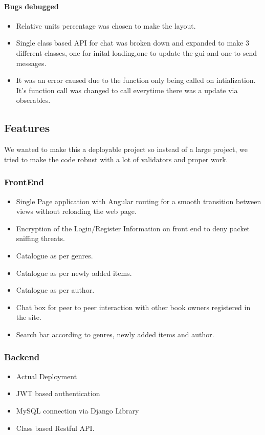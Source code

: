 \documentclass[12pt]{article}
\begin{document}
\paragraph{Bugs debugged}
\begin{itemize}
    \item Relative units percentage was chosen to make the layout.
    \item Single class based API for chat was broken down and expanded to make 3 different classes, one for inital loading,one to update the gui and one to send messages.
    \item It was an error caused due to the function only being called on intialization. It's function call was changed to call everytime there was a update via obserables.
\end{itemize}
\clearpage
\subsection{Features}
We wanted to make this a deployable project so instead of a large project, we tried to make the code robust with a lot of validators and proper work.

\subsubsection{FrontEnd}
\begin{itemize}
    \item Single Page application with Angular routing for a smooth transition between views without reloading the web page.
    \item Encryption of the Login/Register Information on front end to deny packet sniffing threats.
    \item Catalogue as per genres.
    \item Catalogue as per newly added items.
    \item Catalogue as per author.
    \item Chat box for peer to peer interaction with other book owners registered in the site.
    \item Search bar according to genres, newly added items and author.
\end{itemize}
\subsubsection{Backend}
\begin{itemize}
    \item Actual Deployment 
    \item JWT based authentication
    \item MySQL connection via Django Library
    \item Class based Restful API. 
\end{itemize}
\end{document}

